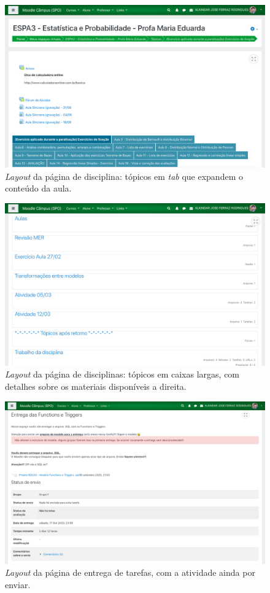 \documentclass[11pt]{article}
\begin{document}
\begin{figure}[htbp]
\centering
\includegraphics[width=.9\linewidth]{./media/disc_2.png}
\caption{\label{fig:orga2241d3}\emph{Layout} da página de disciplina: tópicos em \emph{tab} que expandem o conteúdo da aula.}
\end{figure}
\begin{figure}[htbp]
\centering
\includegraphics[width=.9\linewidth]{./media/disc_3.png}
\caption{\label{fig:org29d7f02}\emph{Layout} da página de disciplinas: tópicos em caixas largas, com detalhes sobre os materiais disponíveis a direita.}
\end{figure}
\begin{figure}[htbp]
\centering
\includegraphics[width=.9\linewidth]{./media/entrega_1.png}
\caption{\label{fig:org38e76da}\emph{Layout} da página de entrega de tarefas, com a atividade ainda por enviar.}
\end{figure}
\end{document}

